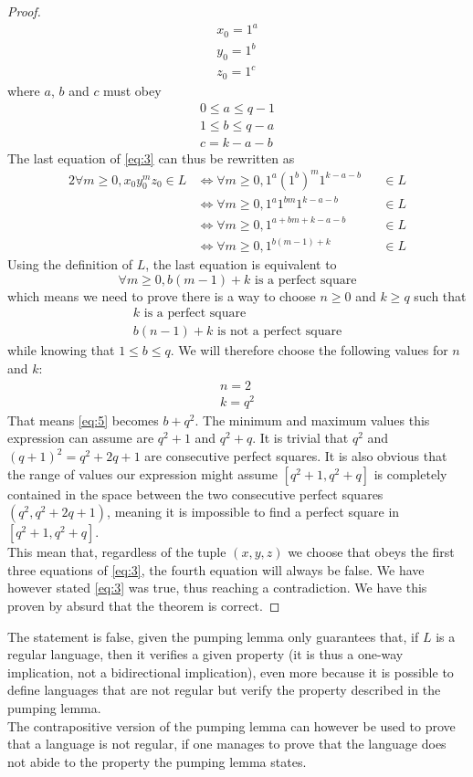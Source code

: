 \documentclass[docid=PA06]{tcom_PA}
\begin{document}
{\begin{proof}
\begin{gather*}
	x_0=1^a\\
	y_0=1^b\\
	z_0=1^c
\end{gather*}
where $a$, $b$ and $c$ must obey
\begin{gather*}
	0 \leq a \leq q-1\\
	1 \leq b \leq q-a\\
	c = k-a-b
\end{gather*}
The last equation of \eqref{eq:3} can thus be rewritten as
\begin{alignat*}{2}
	\forall m \geq 0, x_0 y_0^m z_0 \in L
	&\iff \forall m \geq 0, 1^a {(1^b)}^m 1^{k-a-b} &&\in L\\
	&\iff \forall m \geq 0, 1^a 1^{bm} 1^{k-a-b}    &&\in L\\
	&\iff \forall m \geq 0, 1^{a+bm+k-a-b}          &&\in L\\
	&\iff \forall m \geq 0, 1^{b(m-1)+k}            &&\in L
\end{alignat*}
Using the definition of $L$, the last equation is equivalent to
\begin{equation*}
	\forall m \geq 0, b(m-1)+k \text{ is a perfect square}\end{equation*}
which means we need to prove there is a way to choose $n \geq 0$ and $k \geq q$ such that
\begin{gather}
	\label{eq:4} k \text{ is a perfect square}\\
	\label{eq:5} b(n-1)+k \text{ is not a perfect square}
\end{gather}
while knowing that $1 \leq b \leq q$.
We will therefore choose the following values for $n$ and $k$:
\begin{gather*}
	n = 2\\
	k = q^2
\end{gather*}
That means \eqref{eq:5} becomes $b+q^2$. The minimum and maximum values this expression can assume are $q^2+1$ and $q^2+q$. It is trivial that $q^2$ and $(q+1)^2=q^2+2q+1$ are consecutive perfect squares. It is also obvious that the range of values our expression might assume $[q^2+1,q^2+q]$ is completely contained in the space between the two consecutive perfect squares $(q^2, q^2+2q+1)$, meaning it is impossible to find a perfect square in $[q^2+1,q^2+q]$.\\
This mean that, regardless of the tuple $(x,y,z)$ we choose that obeys the first three equations of \eqref{eq:3}, the fourth equation will always be false. We have however stated \eqref{eq:3} was true, thus reaching a contradiction. We have this proven by absurd that the theorem is correct.
\end{proof}
The statement is false, given the pumping lemma only guarantees that, if $L$ is a regular language, then it verifies a given property (it is thus a one-way implication, not a bidirectional implication), even more because it is possible to define languages that are not regular but verify the property described in the pumping lemma.\\
The contrapositive version of the pumping lemma can however be used to prove that a language is not regular, if one manages to prove that the language does not abide to the property the pumping lemma states.
}
\end{document}
